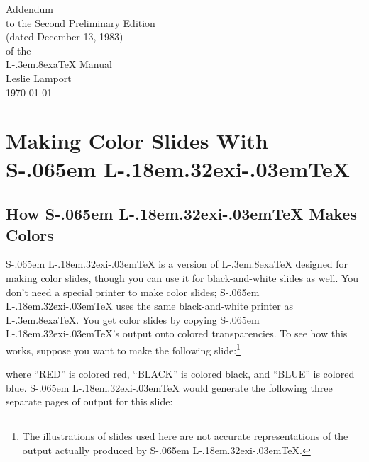 \setlength{\unitlength}{1pt}


\def\LATEX{L\kern-.3em\raise.8ex\hbox{a}\TeX}
\let\TEX = \TeX
\def\BIBTEX{BIB\kern-.1em\TeX}
\def\SLITEX{S\kern-.065em L\kern-.18em\raise.32ex\hbox{i}\kern-.03em\TEX}


\def\knuth{The \TEX book}





\begin{titlepage}
\vspace*{2in}
\begin{center}
\Large Addendum \\to the
Second Preliminary Edition\\
(dated December 13, 1983)\\
of the\\
\LARGE \LATEX{} Manual\\[.3in]
\large Leslie Lamport\\
\today
\end{center}
\end{titlepage}


\appendix

\setcounter{chapter}{2}
\setcounter{page}{156}

\chapter{Making Color Slides
  With \protect\SLITEX}

\section{How \protect\SLITEX{} Makes Colors}

\SLITEX{}  is a version of \LATEX{} designed for making
color slides, 
though you can use it for black-and-white  slides as well.  You don't need a special printer to make color
slides; \SLITEX{} uses the same black-and-white printer as \LATEX.
You get color slides by copying \SLITEX's output onto colored
transparencies.  To see how this works, suppose you want to make
the following slide:\footnote{The illustrations of slides used here are not
accurate representations of the output actually produced by
\SLITEX.}
\begin{center}
\end{center}
where ``{\sf RED}'' is colored red, ``{\sf BLACK}'' is colored black,
and ``{\sf BLUE}'' is colored blue.  \SLITEX{} would generate
the following three separate pages of output for this slide:

